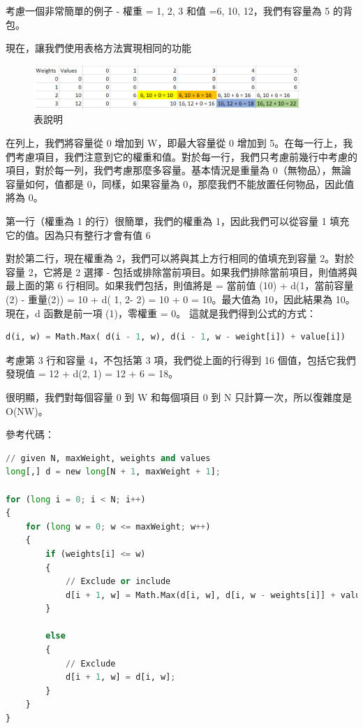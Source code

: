 \documentclass[10pt,UTF8]{ctexart}
\begin{document}
考慮一個非常簡單的例子 - 權重 = {1, 2, 3} 和值 ={6, 10, 12}，我們有容量為 5 的背包。

現在，讓我們使用表格方法實現相同的功能

\begin{figure}[H]
\centering 
\includegraphics[width=0.90\textwidth]{w6-kp-2.png} 
\caption{表說明}
\label{Test}
\end{figure}

在列上，我們將容量從 0 增加到 W，即最大容量從 0 增加到 5。在每一行上，我們考慮項目，我們注意到它的權重和值。對於每一行，我們只考慮前幾行中考慮的項目，對於每一列，我們考慮那麼多容量。基本情況是重量為 0（無物品），無論容量如何，值都是 0，同樣，如果容量為 0，那麼我們不能放置任何物品，因此值將為 0。

第一行（權重為 1 的行）很簡單，我們的權重為 1，因此我們可以從容量 1 填充它的值。因為只有整行才會有值 6

對於第二行，現在權重為 2，我們可以將與其上方行相同的值填充到容量 2。對於容量 2，它將是 2 選擇 - 包括或排除當前項目。如果我們排除當前項目，則值將與最上面的第 6 行相同。如果我們包括，則值將是 = 當前值 (10) + d(1，當前容量 (2) - 重量(2)) = 10 + d( 1, 2- 2) = 10 + 0 = 10。最大值為 10，因此結果為 10。現在，d 函數是前一項 (1)，零權重 = 0。
這就是我們得到公式的方式：


\begin{lstlisting}[language={python}]
d(i, w) = Math.Max( d(i - 1, w), d(i - 1, w - weight[i]) + value[i])
\end{lstlisting}

考慮第 3 行和容量 4，不包括第 3 項，我們從上面的行得到 16 個值，包括它我們發現值 = 12 + d(2, 1) = 12 + 6 = 18。

很明顯，我們對每個容量 0 到 W 和每個項目 0 到 N 只計算一次，所以復雜度是 O(NW)。

參考代碼：

\begin{lstlisting}[language={python}]
// given N, maxWeight, weights and values
long[,] d = new long[N + 1, maxWeight + 1];

for (long i = 0; i < N; i++)
{
	for (long w = 0; w <= maxWeight; w++)
	{                    
		if (weights[i] <= w)
		{
			// Exclude or include
			d[i + 1, w] = Math.Max(d[i, w], d[i, w - weights[i]] + values[i]);
		}

		else
		{
			// Exclude
			d[i + 1, w] = d[i, w];
		}                    
	}
}
\end{lstlisting}
\end{document}
